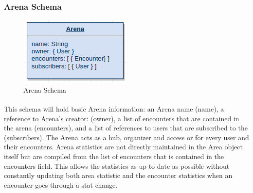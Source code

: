 \documentclass[12pt,a4paper]{report}
\begin{document}
		\subsubsection{Arena Schema}
		
			\begin{figure}[h]
				\centering
				\includegraphics[scale=.75]{schema-arena}
				\caption{Arena Schema}
				\label{fig: Arena Schema }
			\end{figure}
		
			\paragraph{}This schema will hold basic Arena information: an Arena name (name), a reference to Arena's creator: (owner), a list of encounters that are contained in the arena (encounters), and a list of references to users that are subscribed to the (subscribers). The Arena acts as a hub, organizer and access or for every user and their encounters. Arena statistics are not directly maintained in the Area object itself but are compiled from the list of encounters that is contained in the encounters field. This allows the statistics as up to date as possible without constantly updating both area statistic and the encounter statistics when an encounter goes through a stat change.
			
\end{document}
